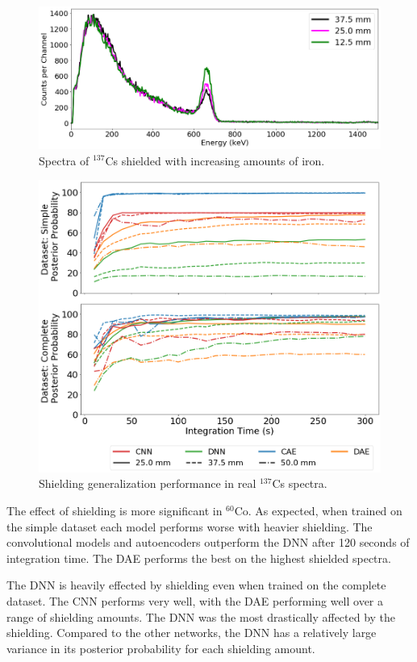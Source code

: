 \begin{figure}[H]
	\centering
	\includegraphics[width=1.0\linewidth]{images/shielded_cs137}
	\caption{Spectra of $^{137}$Cs shielded with increasing amounts of iron.}
	\label{fig:shielded_cs137}
\end{figure}


\begin{figure}[H]
	\centering
	\includegraphics[width=0.9\linewidth]{images/iron_co60}	\caption{Shielding generalization performance in real $^{137}$Cs spectra.}
	\label{fig:iron_cs137}
\end{figure}


The effect of shielding is more significant in $^{60}$Co. As expected, when trained on the simple dataset each model performs worse with heavier shielding. The convolutional models and autoencoders outperform the DNN after 120 seconds of integration time. The DAE performs the best on the highest shielded spectra.  

The DNN is heavily effected by shielding even when trained on the complete dataset. The CNN performs very well, with the DAE performing well over a range of shielding amounts. The DNN was the most drastically affected by the shielding. Compared to the other networks, the DNN has a relatively large variance in its posterior probability for each shielding amount.

